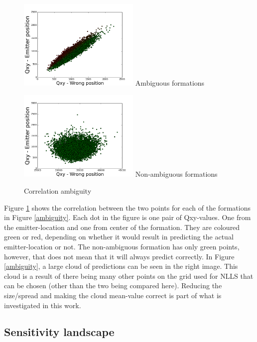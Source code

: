 \documentclass[10pt,a4paper]{book}
\begin{document}
\begin{figure}[H]
\centering
\begin{minipage}{58mm}
  \centering
  \includegraphics[width=58mm]{Correlation_Ambiguous.png}
  Ambiguous formations
\end{minipage}%
\begin{minipage}{58mm}
  \centering
  \includegraphics[width=58mm]{Correlation_Non-ambiguous.png}
  Non-ambiguous formations
\end{minipage}
\caption{Correlation ambiguity}
\label{ambiguity_correlation}
\end{figure}

Figure \ref{ambiguity_correlation} shows the correlation between the two points for each of the formations in Figure \ref{ambiguity}. Each dot in the figure is one pair of Qxy-values. One from the emitter-location and one from center of the formation. They are coloured green or red, depending on whether it would result in predicting the actual emitter-location or not. The non-ambiguous formation has only green points, however, that does not mean that it will always predict correctly. In Figure \ref{ambiguity}, a large cloud of predictions can be seen in the right image. This cloud is a result of there being many other points on the grid used for \gls{NLLS} that can be chosen (other than the two being compared here). Reducing the size/spread and making the cloud mean-value correct is part of what is investigated in this work.


\subsection{Sensitivity landscape}
\end{document}

